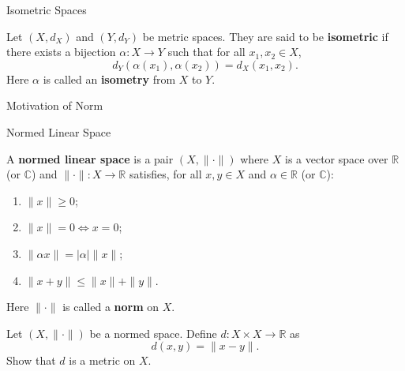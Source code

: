 \documentclass[12pt, a4paper]{article}
\begin{document}
\clearpage

\begin{heading}
    Isometric Spaces
\end{heading}

\vspace{10pt}

\begin{definition}
    Let $(X,d_X)$ and $(Y,d_Y)$ be metric spaces. They are said to be
    \textbf{isometric} if there exists a bijection $\alpha:X\to Y$ such that for
    all $x_1,x_2\in X$,
    \[
        d_Y(\alpha(x_1),\alpha(x_2))=d_X(x_1,x_2).
    \]
    Here $\alpha$ is called an \textbf{isometry} from $X$ to $Y$.
\end{definition}

\clearpage

\begin{heading}
    Motivation of Norm
\end{heading}

\clearpage

\begin{heading}
    Normed Linear Space
\end{heading}

\vspace{10pt}

\begin{definition}
    A \textbf{normed linear space} is a pair $(X,\|\cdot\|)$ where $X$ is a vector space
    over $\mathbb{R}$ (or $\mathbb{C}$) and
    $\|\cdot\|:X\to\mathbb{R}$ satisfies, for all $x,y\in X$ and $\alpha\in\mathbb{R}$
    (or $\mathbb{C}$):
    \begin{enumerate}[label=(N\arabic*)]
    \item $\|x\|\ge 0$;
    \item $\|x\|=0 \iff x=0$;
    \item $\|\alpha x\|=|\alpha|\|x\|$;
    \item $\|x+y\|\le \|x\|+\|y\|$.
    \end{enumerate}
    Here $\|\cdot\|$ is called a \textbf{norm} on $X$.
\end{definition}

\clearpage

\begin{theorem}
    Let $(X,\|\cdot\|)$ be a normed space. Define $d:X\times X\to\mathbb{R}$ as
    \[
        d(x,y)=\|x-y\|.
    \]
    Show that $d$ is a metric on $X$.
\end{theorem}
\end{document}
